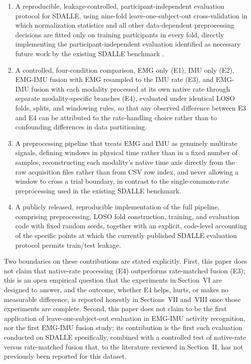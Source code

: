 \documentclass[conference]{IEEEtran}
\begin{document}
\begin{enumerate}
\item A reproducible, leakage-controlled, participant-independent
evaluation protocol for SDALLE, using nine-fold leave-one-subject-out
cross-validation in which normalization statistics and all other
data-dependent preprocessing decisions are fitted only on training
participants in every fold, directly implementing the
participant-independent evaluation identified as necessary future
work by the existing SDALLE benchmark \cite{farouk2026sdalle}.

\item A controlled, four-condition comparison, EMG only (E1), IMU
only (E2), EMG-IMU fusion with EMG resampled to the IMU rate (E3),
and EMG-IMU fusion with each modality processed at its own native
rate through separate modality-specific branches (E4), evaluated
under identical LOSO folds, splits, and windowing rules, so that any
observed difference between E3 and E4 can be attributed to the
rate-handling choice rather than to confounding differences in data
partitioning.

\item A preprocessing pipeline that treats EMG and IMU as genuinely
multirate signals, defining windows in physical time rather than in
a fixed number of samples, reconstructing each modality's native
time axis directly from the raw acquisition files rather than from
CSV row index, and never allowing a window to cross a trial
boundary, in contrast to the single-common-rate preprocessing used
in the existing SDALLE benchmark.

\item A publicly released, reproducible implementation of the full
pipeline, comprising preprocessing, LOSO fold construction, training,
and evaluation code with fixed random seeds, together with an
explicit, code-level accounting of the specific points at which the
currently published SDALLE evaluation protocol permits train/test
leakage.
\end{enumerate}

Two boundaries on these contributions are stated explicitly. First,
this paper does not claim that native-rate processing (E4)
outperforms rate-matched fusion (E3); this is an open empirical
question that the experiments in Section~VI are designed to answer,
and the outcome, whether E4 helps, hurts, or makes no measurable
difference, is reported honestly in Sections~VII and~VIII once
those experiments are complete. Second, this paper does not claim to
be the first application of leave-one-subject-out evaluation in
EMG-IMU activity recognition, nor the first EMG-IMU fusion study;
its contribution is the first such evaluation conducted on SDALLE
specifically, combined with a controlled test of native-rate versus
rate-matched fusion that, to the literature reviewed in Section~II,
has not previously been reported for this dataset.
\end{document}

